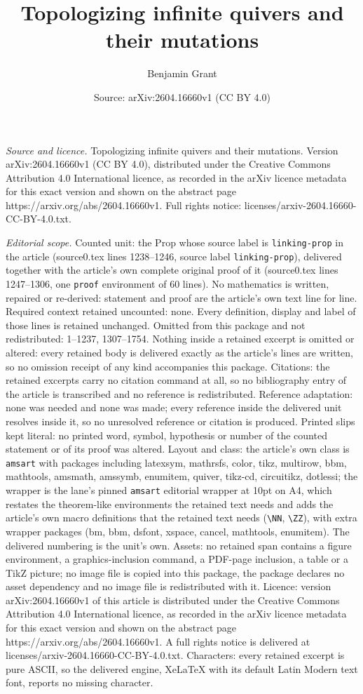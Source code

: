 \documentclass[10pt,a4paper]{amsart}
\title[Topologizing infinite quivers and their mutations]{Topologizing infinite quivers and their mutations}
\author{Benjamin Grant}
\date{Source: arXiv:2604.16660v1 (CC BY 4.0)}
\begin{document}
\maketitle

\noindent\emph{Source and licence.} Topologizing infinite quivers and their mutations. Version arXiv:2604.16660v1 (CC BY 4.0), distributed under the Creative Commons Attribution 4.0 International licence, as recorded in the arXiv licence metadata for this exact version and shown on the abstract page https://arxiv.org/abs/2604.16660v1. Full rights notice: licenses/arxiv-2604.16660-CC-BY-4.0.txt.\par\smallskip

\noindent\textit{Editorial scope.} Counted unit: the Prop whose source label is \texttt{linking-prop} in the article (source0.tex lines 1238--1246, source label \texttt{linking-prop}), delivered together with the article's own complete original proof of it (source0.tex lines 1247--1306, one \texttt{proof} environment of 60 lines). No mathematics is written, repaired or re-derived: statement and proof are the article's own text line for line. Required context retained uncounted: none. Every definition, display and label of those lines is retained unchanged. Omitted from this package and not redistributed: 1--1237, 1307--1754. Nothing inside a retained excerpt is omitted or altered: every retained body is delivered exactly as the article's lines are written, so no omission receipt of any kind accompanies this package. Citations: the retained excerpts carry no citation command at all, so no bibliography entry of the article is transcribed and no reference is redistributed. Reference adaptation: none was needed and none was made; every reference inside the delivered unit resolves inside it, so no unresolved reference or citation is produced. Printed slips kept literal: no printed word, symbol, hypothesis or number of the counted statement or of its proof was altered. Layout and class: the article's own class is \texttt{amsart} with packages including latexsym, mathrsfs, color, tikz, multirow, bbm, mathtools, amsmath, amssymb, enumitem, quiver, tikz-cd, circuitikz, dotlessi; the wrapper is the lane's pinned \texttt{amsart} editorial wrapper at 10pt on A4, which restates the theorem-like environments the retained text needs and adds the article's own macro definitions that the retained text needs (\texttt{\textbackslash NN}, \texttt{\textbackslash ZZ}), with extra wrapper packages (bm, bbm, dsfont, xspace, cancel, mathtools, enumitem). The delivered numbering is the unit's own. Assets: no retained span contains a figure environment, a graphics-inclusion command, a PDF-page inclusion, a table or a TikZ picture; no image file is copied into this package, the package declares no asset dependency and no image file is redistributed with it. Licence: version arXiv:2604.16660v1 of this article is distributed under the Creative Commons Attribution 4.0 International licence, as recorded in the arXiv licence metadata for this exact version and shown on the abstract page https://arxiv.org/abs/2604.16660v1. A full rights notice is delivered at licenses/arxiv-2604.16660-CC-BY-4.0.txt. Characters: every retained excerpt is pure ASCII, so the delivered engine, XeLaTeX with its default Latin Modern text font, reports no missing character.
\end{document}
